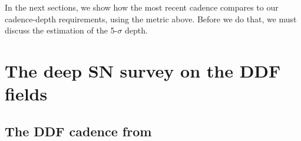 \documentclass[\docopts]{\docclass}
\begin{document}
In the next sections, we show how the most recent 
cadence compares to our cadence-depth requirements, using the metric
above.  Before we do that, we must discuss the estimation of the
5-$\sigma$ depth. 






\section{The deep SN survey on the DDF fields}
\label{sec:ddf_cadence}




\subsection{The DDF cadence from }
\label{sec:results}
\end{document}
